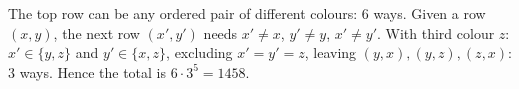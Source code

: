 The top row can be any ordered pair of different colours: $6$ ways. Given a row $(x,y)$, the next row $(x',y')$ needs $x'\ne x$, $y'\ne y$, $x'\ne y'$. With third colour $z$: $x'\in\{y,z\}$ and $y'\in\{x,z\}$, excluding $x'=y'=z$, leaving $(y,x),(y,z),(z,x)$: $3$ ways. Hence the total is $6\cdot3^5=\boxed{1458}$.
